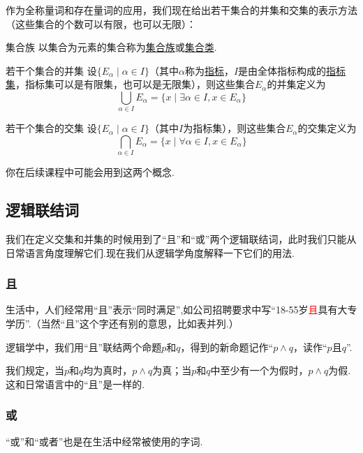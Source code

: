 \documentclass[lang=cn,math=cm,chinesefont=nofont,11pt,scheme=chinese,twocol]{elegantbook}
\begin{document}
作为全称量词和存在量词的应用，我们现在给出若干集合的并集和交集的表示方法（这些集合的个数可以有限，也可以无限）：

\begin{definition}{集合族}
  以集合为元素的集合称为\underline{集合族}或\underline{集合类}.
\end{definition}

\begin{definition}{若干个集合的并集}
  设$\{E_\alpha\mid\alpha\in I\}$（其中$\alpha$称为\underline{指标}，$I$是由全体指标构成的\underline{指标集}，指标集可以是有限集，也可以是无限集），则这些集合$E_\alpha$的并集定义为$$\bigcup_{\alpha\in I}E_\alpha=\{x\mid\exists\alpha\in I,x\in E_\alpha\}$$
\end{definition}

\begin{definition}{若干个集合的交集}
  设$\{E_\alpha\mid\alpha\in I\}$（其中$I$为指标集），则这些集合$E_\alpha$的交集定义为$$\bigcap_{\alpha\in I}E_\alpha=\{x\mid\forall\alpha\in I,x\in E_\alpha\}$$
\end{definition}

你在后续课程中可能会用到这两个概念.

\subsection{逻辑联结词}

我们在定义交集和并集的时候用到了“且”和“或”两个逻辑联结词，此时我们只能从日常语言角度理解它们.现在我们从逻辑学角度解释一下它们的用法.

\subsubsection{且}

生活中，人们经常用“且”表示“同时满足”,如公司招聘要求中写“18-55岁\textcolor{red}{且}具有大专学历”.（当然“且”这个字还有别的意思，比如表并列.）

逻辑学中，我们用“且”联结两个命题$p$和$q$，得到的新命题记作“$p\land q$，读作“$p$且$q$”.

我们规定，当$p$和$q$均为真时，$p\land q$为真；当$p$和$q$中至少有一个为假时，$p\land q$为假.这和日常语言中的“且”是一样的.

\subsubsection{或}

“或”和“或者”也是在生活中经常被使用的字词.
\end{document}
